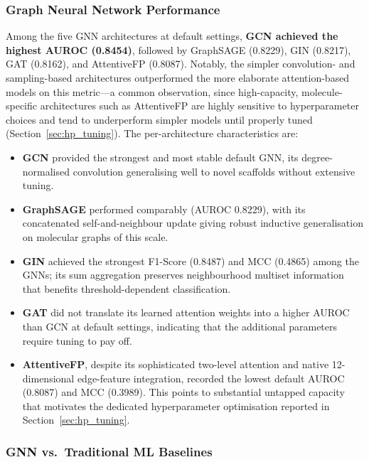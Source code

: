 \subsubsection{Graph Neural Network Performance}

Among the five GNN architectures at default settings, \textbf{GCN achieved the
highest AUROC (0.8454)}, followed by GraphSAGE (0.8229), GIN (0.8217), GAT
(0.8162), and AttentiveFP (0.8087). Notably, the simpler convolution- and
sampling-based architectures outperformed the more elaborate attention-based
models on this metric---a common observation, since high-capacity,
molecule-specific architectures such as AttentiveFP are highly sensitive to
hyperparameter choices and tend to underperform simpler models until properly
tuned (Section~\ref{sec:hp_tuning}). The per-architecture characteristics are:
\begin{itemize}
    \item \textbf{GCN} provided the strongest and most stable default GNN, its
          degree-normalised convolution generalising well to novel scaffolds without
          extensive tuning.
    \item \textbf{GraphSAGE} performed comparably (AUROC 0.8229), with its
          concatenated self-and-neighbour update giving robust inductive
          generalisation on molecular graphs of this scale.
    \item \textbf{GIN} achieved the strongest F1-Score (0.8487) and MCC (0.4865)
          among the GNNs; its sum aggregation preserves neighbourhood multiset
          information that benefits threshold-dependent classification.
    \item \textbf{GAT} did not translate its learned attention weights into a higher
          AUROC than GCN at default settings, indicating that the additional
          parameters require tuning to pay off.
    \item \textbf{AttentiveFP}, despite its sophisticated two-level attention and
          native 12-dimensional edge-feature integration, recorded the lowest
          default AUROC (0.8087) and MCC (0.3989). This points to substantial
          untapped capacity that motivates the dedicated hyperparameter optimisation
          reported in Section~\ref{sec:hp_tuning}.
\end{itemize}

\subsubsection{GNN vs.\ Traditional ML Baselines}

